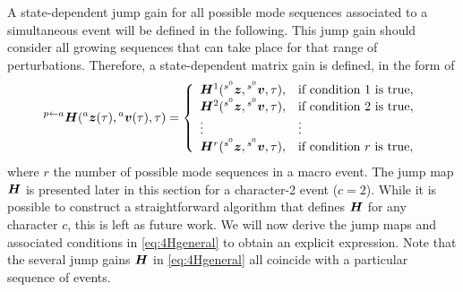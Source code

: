 \documentclass[../DC2017114Bouma.tex]{subfiles}
\begin{document}
A state-dependent jump gain for all possible mode sequences associated to a simultaneous event will be defined in the following. This jump gain should consider all growing sequences that can take place for that range of perturbations. Therefore, a state-dependent matrix gain is defined, in the form of
\begin{align}
\hspace{0cm}^{p \leftarrow a}{\boldsymbol{H}}(\hspace{0cm}^{a}{\boldsymbol{z}}(\tau),\hspace{0cm}^{a}{\boldsymbol{v}}(\tau),\tau) = \left\lbrace\begin{array}{ll}
{\boldsymbol{H}}^1(\hspace{0cm}^{s^0}{\boldsymbol{z}},\hspace{0cm}^{s^0}{\boldsymbol{v}},\tau), & \text{if condition 1 is true},\\
{\boldsymbol{H}}^2(\hspace{0cm}^{s^0}{\boldsymbol{z}},\hspace{0cm}^{s^0}{\boldsymbol{v}},\tau), & \text{if condition 2 is true},\\
\vdots & \vdots\\
{\boldsymbol{H}}^{r}(\hspace{0cm}^{s^0}{\boldsymbol{z}},\hspace{0cm}^{s^0}{\boldsymbol{v}},\tau), & \text{if condition }r\text{ is true},
\end{array}\right.\label{eq:4Hgeneral}
\end{align}
where $r$ the number of possible mode sequences in a macro event. The jump map ${\boldsymbol{H}}$ is presented later in this section for a character-2 event ($c=2$). While it is possible to construct a straightforward algorithm that defines ${\boldsymbol{H}}$ for any character $c$, this is left as future work. We will now derive the jump maps and associated conditions in \eqref{eq:4Hgeneral} to obtain an explicit expression. Note that the several jump gains ${\boldsymbol{H}}$ in \eqref{eq:4Hgeneral} all coincide with a particular sequence of events.
\end{document}
